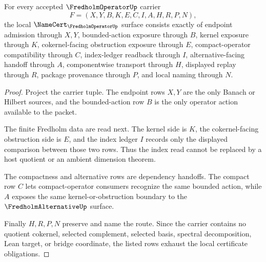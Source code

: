 \begin{theorem}
\label{thm:fredholm-operator-namecert-obligations}
For every accepted $\FredholmOperatorUp$ carrier
$$
F=(X,Y,B,K,E,C,I,A,H,R,P,N),
$$
the local $\NameCert_{\FredholmOperatorUp}$ surface consists exactly of endpoint admission through $X,Y$, bounded-action exposure through $B$, kernel exposure through $K$, cokernel-facing obstruction exposure through $E$, compact-operator compatibility through $C$, index-ledger readback through $I$, alternative-facing handoff through $A$, componentwise transport through $H$, displayed replay through $R$, package provenance through $P$, and local naming through $N$.
\end{theorem}
\begin{proof}
Project the carrier tuple. The endpoint rows $X,Y$ are the only Banach or Hilbert sources, and the bounded-action row $B$ is the only operator action available to the packet.

The finite Fredholm data are read next. The kernel side is $K$, the cokernel-facing obstruction side is $E$, and the index ledger $I$ records only the displayed comparison between those two rows. Thus the index read cannot be replaced by a host quotient or an ambient dimension theorem.

The compactness and alternative rows are dependency handoffs. The compact row $C$ lets compact-operator consumers recognize the same bounded action, while $A$ exposes the same kernel-or-obstruction boundary to the $\FredholmAlternativeUp$ surface.

Finally $H,R,P,N$ preserve and name the route. Since the carrier contains no quotient cokernel, selected complement, selected basis, spectral decomposition, Lean target, or bridge coordinate, the listed rows exhaust the local certificate obligations.
\end{proof}

